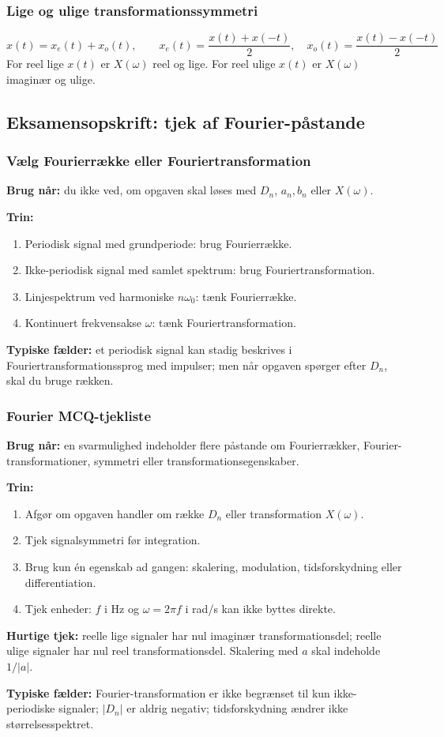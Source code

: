 \subsubsection{Lige og ulige transformationssymmetri}
\[
x(t)=x_e(t)+x_o(t),\qquad
x_e(t)=\frac{x(t)+x(-t)}{2},\quad x_o(t)=\frac{x(t)-x(-t)}{2}
\]
For reel lige \(x(t)\) er \(X(\omega)\) reel og lige. For reel ulige \(x(t)\) er \(X(\omega)\) imaginær og ulige.

\subsection{Eksamensopskrift: tjek af Fourier-påstande}

\subsubsection{Vælg Fourierrække eller Fouriertransformation}
\textbf{Brug når:} du ikke ved, om opgaven skal løses med \(D_n\), \(a_n,b_n\) eller \(X(\omega)\).

\textbf{Trin:}
\begin{enumerate}
    \item Periodisk signal med grundperiode: brug Fourierrække.
    \item Ikke-periodisk signal med samlet spektrum: brug Fouriertransformation.
    \item Linjespektrum ved harmoniske \(n\omega_0\): tænk Fourierrække.
    \item Kontinuert frekvensakse \(\omega\): tænk Fouriertransformation.
\end{enumerate}

\textbf{Typiske fælder:} et periodisk signal kan stadig beskrives i Fouriertransformationssprog med impulser; men når opgaven spørger efter \(D_n\), skal du bruge rækken.

\subsubsection{Fourier MCQ-tjekliste}
\textbf{Brug når:} en svarmulighed indeholder flere påstande om Fourierrækker, Fourier-transformationer, symmetri eller transformationsegenskaber.

\textbf{Trin:}
\begin{enumerate}
    \item Afgør om opgaven handler om række \(D_n\) eller transformation \(X(\omega)\).
    \item Tjek signalsymmetri før integration.
    \item Brug kun én egenskab ad gangen: skalering, modulation, tidsforskydning eller differentiation.
    \item Tjek enheder: \(f\) i Hz og \(\omega=2\pi f\) i rad/s kan ikke byttes direkte.
\end{enumerate}

\textbf{Hurtige tjek:} reelle lige signaler har nul imaginær transformationsdel; reelle ulige signaler har nul reel transformationsdel. Skalering med \(a\) skal indeholde \(1/|a|\).

\textbf{Typiske fælder:} Fourier-transformation er ikke begrænset til kun ikke-periodiske signaler; \(|D_n|\) er aldrig negativ; tidsforskydning ændrer ikke størrelsesspektret.
